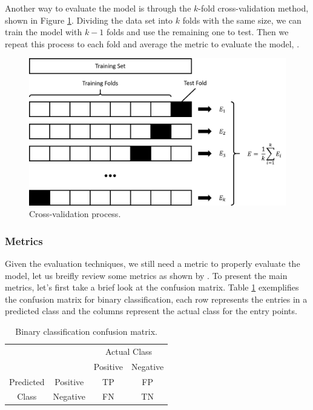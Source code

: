 	Another way to evaluate the model is through the $k$-fold cross-validation method, shown in Figure \ref{fig:cross-validate}. Dividing the data set into $k$ folds with the same size, we can train the model with $k-1$ folds and use the remaining one to test. Then we repeat this process to each fold and average the metric to evaluate the model, \cite{schaffer1993selecting}.

	\begin{figure}[h!]
		\centering
		\includegraphics[width=0.6\linewidth]{01.Chapters/02.Background/cross-validate}
		\caption{Cross-validation process.}
		\label{fig:cross-validate}
	\end{figure}

	\subsubsection{Metrics}
	\label{sub-sub:metrics}

	Given the evaluation techniques, we still need a metric to properly evaluate the model, let us breifly review some metrics as shown by . To present the main metrics, let's first take a brief look at the confusion matrix. Table \ref{tab:conf-matrix} exemplifies the confusion matrix for binary classification, each row represents the entries in a predicted class and the columns represent the actual class for the entry points.

	\begin{table}[h!]
		\centering
		\caption{Binary classification confusion matrix.}
		\label{tab:conf-matrix}
		\begin{tabular}{cc|c|c|}
			\cline{3-4}
			&          & \multicolumn{2}{c|}{Actual Class} \\ \cline{3-4}
			&          & Positive        & Negative        \\ \hline
			\multicolumn{1}{|c|}{Predicted} & Positive & TP              & FP              \\ \cline{2-4}
			\multicolumn{1}{|c|}{Class}     & Negative & FN              & TN              \\ \hline
		\end{tabular}
	\end{table}


